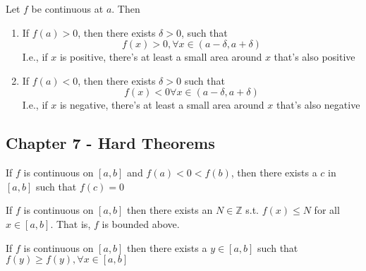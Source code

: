 \documentclass{report}
\begin{document}
   {
    Let $f$ be continuous at $a$.  Then
    \begin{enumerate}
      \item If $f(a)>0$, then there exists $\delta > 0$, such that
        \[ f(x)>0, \forall x \in (a - \delta, a + \delta) \]
        I.e., if $x$ is positive, there's at least a small area around
        $x$ that's also positive
      \item If $f(a) < 0$, then  there exists $\delta > 0$ such that
        \[ f(x) < 0 \forall x \in (a- \delta, a + \delta) \]
        I.e., if $x$ is negative, there's at least a small area around
        $x$ that's also negative
    \end{enumerate}
  }

\newpage
  \subsection*{Chapter 7 - Hard Theorems}%





   {
    If $f$ is continuous on $[a,b]$ and $f(a) < 0 < f(b)$, then there
    exists a $c$ in $[a,b]$ such that $f(c)=0$
  }

   {
    If $f$ is continuous on $[a,b]$ then there exists an
    $N \in \mathbb{Z} $ s.t. $f(x) \leq N$ for all $x \in [a,b]$.
    That is, $f$ is bounded above.
  }

   {
    If $f$ is continuous on $[a,b]$ then there exists a $y \in [a,b]$
    such that $f(y) \geq f(y), \forall x \in [a,b]$
  }
\end{document}
